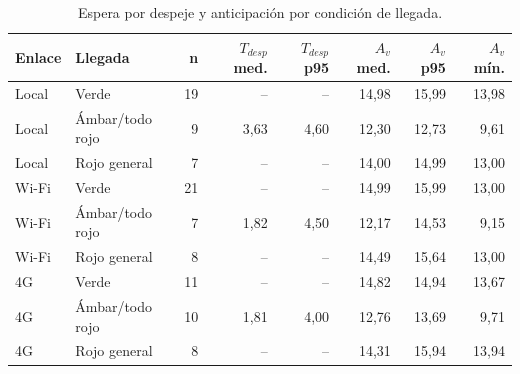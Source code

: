 \begin{table}[H]
\centering
\caption{Espera por despeje y anticipación por condición de llegada.}
\label{tab:latencia_por_condicion}
\small
\begin{tabular}{llrrrrrr}
\toprule
\textbf{Enlace} & \textbf{Llegada} & \textbf{n} & \textbf{$T_{desp}$ med.} & \textbf{$T_{desp}$ p95} & \textbf{$A_v$ med.} & \textbf{$A_v$ p95} & \textbf{$A_v$ mín.} \\
\midrule
Local & Verde & 19 & -- & -- & 14,98 & 15,99 & 13,98 \\
Local & Ámbar/todo rojo & 9 & 3,63 & 4,60 & 12,30 & 12,73 & 9,61 \\
Local & Rojo general & 7 & -- & -- & 14,00 & 14,99 & 13,00 \\
\addlinespace
Wi-Fi & Verde & 21 & -- & -- & 14,99 & 15,99 & 13,00 \\
Wi-Fi & Ámbar/todo rojo & 7 & 1,82 & 4,50 & 12,17 & 14,53 & 9,15 \\
Wi-Fi & Rojo general & 8 & -- & -- & 14,49 & 15,64 & 13,00 \\
\addlinespace
4G & Verde & 11 & -- & -- & 14,82 & 14,94 & 13,67 \\
4G & Ámbar/todo rojo & 10 & 1,81 & 4,00 & 12,76 & 13,69 & 9,71 \\
4G & Rojo general & 8 & -- & -- & 14,31 & 15,94 & 13,94 \\
\bottomrule
\end{tabular}
\par{}
\end{table}

